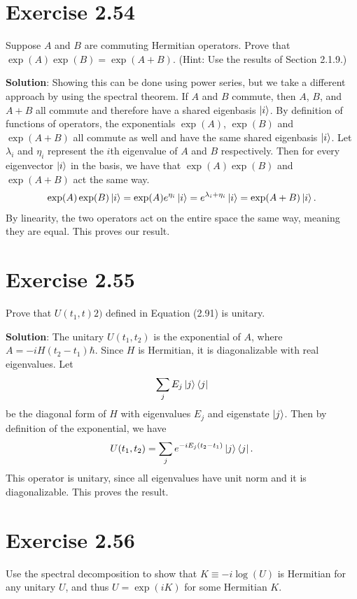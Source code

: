 \documentclass{book}
\begin{document}
\section*{Exercise 2.54}
    Suppose $A$ and $B$ are commuting Hermitian operators. Prove that $\exp(A) \exp(B) = \exp(A + B)$. (Hint: Use the results of Section 2.1.9.)
    
    \textbf{Solution}: Showing this can be done using power series, but we take a different approach by using the spectral theorem. If $A$ and $B$ commute, then $A$, $B$, and $A+B$ all commute and therefore have a shared eigenbasis $\ket{i}$. By definition of functions of operators, the exponentials $\exp(A)$, $\exp(B)$ and $\exp(A+B)$ all commute as well and have the same shared eigenbasis $\ket{i}$. Let $\lambda_i$ and $\eta_i$ represent the $i$th eigenvalue of $A$ and $B$ respectively. Then for every eigenvector $\ket{i}$ in the basis, we have that $\exp(A)\exp(B)$ and $\exp(A+B)$ act the same way.
    \begin{align}
        \exp(A)\exp(B) \ket{i} = \exp(A) e^{\eta_i} \ket{i} = e^{\lambda_i + \eta_i} \ket{i} = \exp(A+B) \ket{i}.
    \end{align}
    By linearity, the two operators act on the entire space the same way, meaning they are equal. This proves our result.
    
\section*{Exercise 2.55}
    Prove that $U(t_1,t)2)$ defined in Equation (2.91) is unitary.
    
    \textbf{Solution}: The unitary $U(t_1,t_2)$ is the exponential of $A$, where $A = -i H (t_2 - t_1)\hbar$. Since $H$ is Hermitian, it is diagonalizable with real eigenvalues. Let
    \begin{align}
        \sum_j E_j \ket{j}\bra{j}
    \end{align}
    be the diagonal form of $H$ with eigenvalues $E_j$ and eigenstate $\ket{j}$. Then by definition of the exponential, we have
    \begin{align}
        U(t_1, t_2) = \sum_j e^{-i E_j (t_2-t_1)} \ket{j}\bra{j}.
    \end{align}
    This operator is unitary, since all eigenvalues have unit norm and it is diagonalizable. This proves the result.
    
\section*{Exercise 2.56}
    Use the spectral decomposition to show that $K \equiv -i \log(U)$ is Hermitian for any unitary $U$, and thus $U = \exp(iK)$ for some Hermitian $K$.
    
\end{document}
